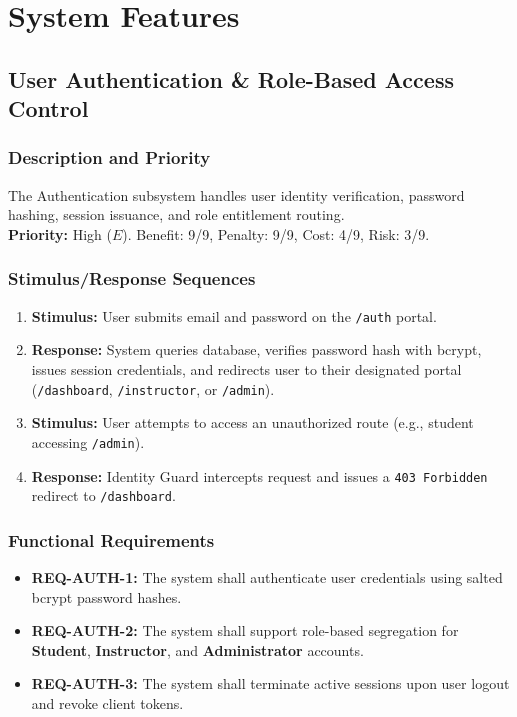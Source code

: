 \documentclass[a4paper,12pt]{article}
\begin{document}
\newpage
\section{System Features}

\subsection{User Authentication \& Role-Based Access Control}

\subsubsection{Description and Priority}
The Authentication subsystem handles user identity verification, password hashing, session issuance, and role entitlement routing. \\
\textbf{Priority:} High ($E$). Benefit: 9/9, Penalty: 9/9, Cost: 4/9, Risk: 3/9.

\subsubsection{Stimulus/Response Sequences}
\begin{enumerate}[leftmargin=1.2cm]
    \item \textbf{Stimulus:} User submits email and password on the \texttt{/auth} portal.
    \item \textbf{Response:} System queries database, verifies password hash with bcrypt, issues session credentials, and redirects user to their designated portal (\texttt{/dashboard}, \texttt{/instructor}, or \texttt{/admin}).
    \item \textbf{Stimulus:} User attempts to access an unauthorized route (e.g., student accessing \texttt{/admin}).
    \item \textbf{Response:} Identity Guard intercepts request and issues a \texttt{403 Forbidden} redirect to \texttt{/dashboard}.
\end{enumerate}

\subsubsection{Functional Requirements}
\begin{itemize}[leftmargin=1.2cm]
    \item \textbf{REQ-AUTH-1:} The system shall authenticate user credentials using salted bcrypt password hashes.
    \item \textbf{REQ-AUTH-2:} The system shall support role-based segregation for \textbf{Student}, \textbf{Instructor}, and \textbf{Administrator} accounts.
    \item \textbf{REQ-AUTH-3:} The system shall terminate active sessions upon user logout and revoke client tokens.
\end{itemize}
\end{document}
